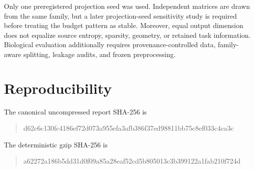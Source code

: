 \documentclass[11pt]{article}
\begin{document}
Only one preregistered projection seed was used. Independent matrices are drawn from the same family, but a later projection-seed sensitivity study is required before treating the budget pattern as stable. Moreover, equal output dimension does not equalize source entropy, sparsity, geometry, or retained task information. Biological evaluation additionally requires provenance-controlled data, family-aware splitting, leakage audits, and frozen preprocessing.

\section{Reproducibility}
The canonical uncompressed report SHA-256 is
\begin{quote}\small\ttfamily
 d62c6c130fc4186ef72d073a955efa3afb386f37ed98811bb75c8ef033c4ca3c
\end{quote}
The deterministic gzip SHA-256 is
\begin{quote}\small\ttfamily
 a62272a186b5dd31d0f09a85a28eaf52cd5b805013c3b399122a1fab210f724d
\end{quote}
\end{document}
